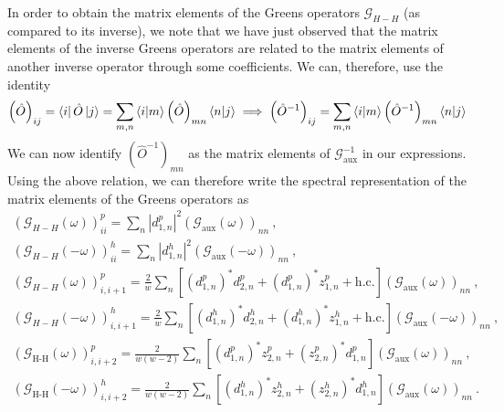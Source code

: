\documentclass{report}
\numberwithin{equation}{section}
\begin{document}
In order to obtain the matrix elements of the Greens operators \(\mathcal{G}_{H-H}\) (as compared to its inverse), we note that we have just observed that the matrix elements of the inverse Greens operators are related to the matrix elements of another inverse operator through some coefficients. We can, therefore, use the identity
\begin{equation}\begin{aligned}
\left(\hat O\right)_{ij} = \bra{i} \hat O \ket{j} = \sum_{m,n} \braket{i|m} \left(\hat O\right)_{mn} \braket{n|j} \implies \left(\hat O^{-1}\right)_{ij} = \sum_{m,n} \braket{i|m} \left(\hat O^{-1}\right)_{mn} \braket{n|j}
\end{aligned}\end{equation}
We can now identify \(\left(\hat O^{-1}\right)_{mn}\) as the matrix elements of \(\mathcal{G}_\text{aux}^{-1}\) in our expressions. Using the above relation, we can therefore write the spectral representation of the matrix elements of the Greens operators as 
\begin{gather}
	\left(\mathcal{G}_{H-H}(\omega)\right)^p_{ii} = \sum_{n} |d^p_{1,n}|^2 \left(\mathcal{G}_\text{aux}(\omega)\right)_{nn}~,\\
	\left(\mathcal{G}_{H-H}(-\omega)\right)^h_{ii} = \sum_{n} |d^h_{1,n}|^2 \left(\mathcal{G}_\text{aux}(-\omega)\right)_{nn}~,\\
	\left(\mathcal{G}_{H-H}\left(\omega\right) \right)^p_{i,i+1} = \frac{2}{w}\sum_n \left[\left(d^p_{1,n}\right)^*d^p_{2,n} + \left(d^p_{1,n}\right)^* z^p_{1,n} + \text{h.c.}\right] \left(\mathcal{G}_\text{aux}(\omega) \right)_{nn}~,\\
	\left(\mathcal{G}_{H-H}\left(-\omega\right) \right)^h_{i,i+1} = \frac{2}{w}\sum_n \left[\left(d^h_{1,n}\right)^*d^h_{2,n} + \left(d^h_{1,n}\right)^* z^h_{1,n} + \text{h.c.}\right] \left(\mathcal{G}_\text{aux}(-\omega) \right)_{nn}~,\\
	\left(\mathcal{G}_\text{H-H}\left( \omega \right) \right)^p_{i,i+2} = \frac{2}{w(w-2)}\sum_n \left[\left(d^p_{1,n}\right)^* z^p_{2,n} + \left(z^p_{2,n}\right)^* d^p_{1,n}\right] \left(\mathcal{G}_\text{aux}(\omega)\right)_{nn}~,\\
	\left(\mathcal{G}_\text{H-H}\left( -\omega \right) \right)^h_{i,i+2} = \frac{2}{w(w-2)}\sum_n \left[\left(d^h_{1,n}\right)^* z^h_{2,n} + \left(z^h_{2,n}\right)^* d^h_{1,n}\right] \left(\mathcal{G}_\text{aux}(\omega)\right)_{nn}~.
\end{gather}
\end{document}
